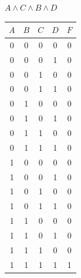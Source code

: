     \begin{minipage}[t]{0.44\textwidth}
        \centering
        \begin{enumerate}
            \setcounter{enumi}{2}
            \begin{spacing}{1.2}
                \item $A \wedge C \wedge B \wedge D$\\
            \end{spacing}
            \begin{tabular}{|c|c|c|c|c|}
                \hline
                $A$ & $B$ & $C$ & $D$ & $F$ \\
                \hline
                0   & 0   & 0   & 0   & 0   \\
                \hline
                0   & 0   & 0   & 1   & 0   \\
                \hline
                0   & 0   & 1   & 0   & 0   \\
                \hline
                0   & 0   & 1   & 1   & 0   \\
                \hline
                0   & 1   & 0   & 0   & 0   \\
                \hline
                0   & 1   & 0   & 1   & 0   \\
                \hline
                0   & 1   & 1   & 0   & 0   \\
                \hline
                0   & 1   & 1   & 1   & 0   \\
                \hline
                1   & 0   & 0   & 0   & 0   \\
                \hline
                1   & 0   & 0   & 1   & 0   \\
                \hline
                1   & 0   & 1   & 0   & 0   \\
                \hline
                1   & 0   & 1   & 1   & 0   \\
                \hline
                1   & 1   & 0   & 0   & 0   \\
                \hline
                1   & 1   & 0   & 1   & 0   \\
                \hline
                1   & 1   & 1   & 0   & 0   \\
                \hline
                1   & 1   & 1   & 1   & 1   \\
                \hline

            \end{tabular}
        \end{enumerate}
    \end{minipage}

